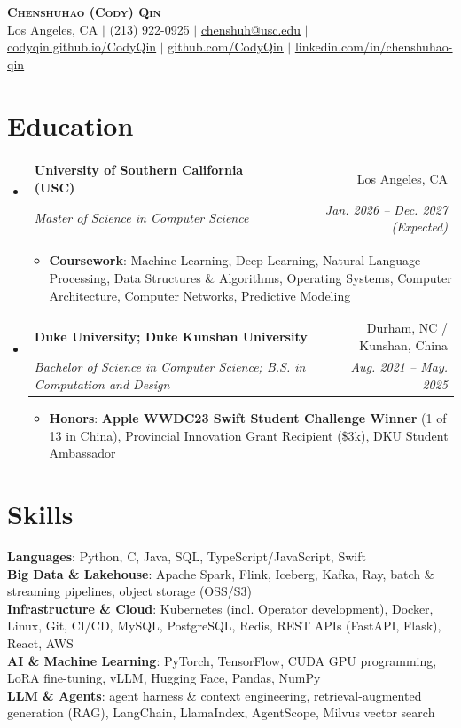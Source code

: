 \documentclass[letterpaper,10pt]{article}
\makeatletter
\newcommand{\resumeItem}[1]{
  \item\small{
    {#1}
  }
}
\newcommand{\resumeSubheading}[4]{
  \item
    \begin{tabular*}{0.97\textwidth}[t]{l@{\extracolsep{\fill}}r}
      \textbf{#1} & #2 \\
      \textit{\small#3} & \textit{\small #4} \\
    \end{tabular*}\vspace{-1pt}
}
\newcommand{\resumeSubHeadingListStart}{\begin{itemize}[leftmargin=0.15in, label={}, itemsep=2pt, topsep=2pt, parsep=0pt]}
\newcommand{\resumeSubHeadingListEnd}{\end{itemize}}
\newcommand{\resumeItemListStart}{\begin{itemize}[leftmargin=0.15in, itemsep=1pt, topsep=2pt, parsep=0pt]}
\newcommand{\resumeItemListEnd}{\end{itemize}\vspace{-3pt}}
\makeatother
\begin{document}
\begin{flushleft}
    \textbf{\Huge \scshape Chenshuhao (Cody) Qin} \\ \vspace{3pt}
    \small
    Los Angeles, CA $|$ (213) 922-0925 $|$
    \href{mailto:chenshuh@usc.edu}{\underline{chenshuh@usc.edu}} $|$
    \href{https://codyqin.github.io/CodyQin/}{\underline{codyqin.github.io/CodyQin}} $|$
    \href{https://github.com/CodyQin}{\underline{github.com/CodyQin}} $|$
    \href{https://www.linkedin.com/in/chenshuhao-qin/}{\underline{linkedin.com/in/chenshuhao-qin}}
\end{flushleft}

\section{Education}
  \resumeSubHeadingListStart
    \resumeSubheading
      {University of Southern California (USC)}{Los Angeles, CA}
      {Master of Science in Computer Science}{Jan. 2026 -- Dec. 2027 (Expected)}
      \resumeItemListStart
        \resumeItem{\textbf{Coursework}: Machine Learning, Deep Learning, Natural Language Processing, Data Structures \& Algorithms, Operating Systems, Computer Architecture, Computer Networks, Predictive Modeling}
      \resumeItemListEnd
    \resumeSubheading
      {Duke University; Duke Kunshan University}{Durham, NC / Kunshan, China}
      {Bachelor of Science in Computer Science; B.S. in Computation and Design}{Aug. 2021 -- May. 2025}
      \resumeItemListStart
        \resumeItem{\textbf{Honors}: \textbf{Apple WWDC23 Swift Student Challenge Winner} (1 of 13 in China), Provincial Innovation Grant Recipient (\$3k), DKU Student Ambassador}
      \resumeItemListEnd
  \resumeSubHeadingListEnd

\section{Skills}
 \begin{itemize}[leftmargin=0.15in, label={}, itemsep=0pt, topsep=1pt, parsep=0pt]
    \small{\item{
     \textbf{Languages}{: Python, C, Java, SQL, TypeScript/JavaScript, Swift} \\
     \textbf{Big Data \& Lakehouse}{: Apache Spark, Flink, Iceberg, Kafka, Ray, batch \& streaming pipelines, object storage (OSS/S3)} \\
     \textbf{Infrastructure \& Cloud}{: Kubernetes (incl. Operator development), Docker, Linux, Git, CI/CD, MySQL, PostgreSQL, Redis, REST APIs (FastAPI, Flask), React, AWS} \\
     \textbf{AI \& Machine Learning}{: PyTorch, TensorFlow, CUDA GPU programming, LoRA fine-tuning, vLLM, Hugging Face, Pandas, NumPy} \\
     \textbf{LLM \& Agents}{: agent harness \& context engineering, retrieval-augmented generation (RAG), LangChain, LlamaIndex, AgentScope, Milvus vector search}
    }}
 \end{itemize}
\end{document}
